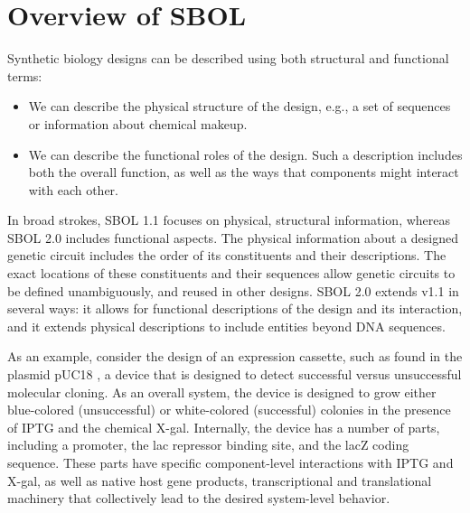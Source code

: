 \section{Overview of SBOL}



Synthetic biology designs can be described using both structural and functional terms:
\begin{itemize}
\item We can describe the physical structure of the design, e.g., a set of sequences or information about chemical makeup.
\item We can describe the functional roles of the design. Such a description includes both the overall function, as well as the ways that components might interact with each other.
\end{itemize}
In broad strokes, SBOL 1.1 focuses on physical, structural information, whereas SBOL 2.0 includes functional aspects. The physical information about a designed genetic circuit includes the order of its constituents and their descriptions. The exact locations of these constituents and their sequences allow genetic circuits to be defined unambiguously, and reused in other designs. SBOL 2.0 extends v1.1 in several ways: it allows for functional descriptions of the design and its interaction, and it extends physical descriptions to include entities beyond DNA sequences. 

As an example, consider the design of an expression cassette, such as found in the plasmid pUC18 \cite{L08752.1}, a device that is designed to detect successful versus unsuccessful molecular cloning. As an overall system, the device is designed to grow either blue-colored (unsuccessful) or white-colored (successful) colonies in the presence of IPTG and the chemical X-gal. Internally, the device has a number of parts, including a promoter, the lac repressor binding site, and the lacZ coding sequence. These parts have specific component-level interactions with IPTG and X-gal, as well as native host gene products, transcriptional and translational machinery that collectively lead to the desired system-level behavior. 

